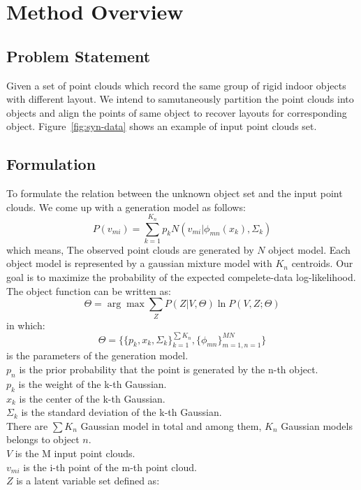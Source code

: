 \section{Method Overview}
\label{sec:method}
\subsection{Problem Statement}
Given a set of point clouds which record the same group of rigid indoor objects with different layout. We intend to samutaneously partition the point clouds into objects and align the points of same object to recover layouts for corresponding object. Figure~\ref{fig:syn-data} shows an example of input point clouds set.
\subsection{Formulation}
To formulate the relation between the unknown object set and the input point clouds. We come up with a generation model as follows:
\begin{equation}
\label{equ:model}
P(v_{mi})=\sum^{K_n}_{k=1}p_kN(v_{mi}|\phi_{mn}(x_k),\Sigma_k)
\end{equation}
which means,
The observed point clouds are generated by $N$ object model. 
Each object model is represented by a gaussian mixture model with $K_n$ centroids.
Our goal is to maximize the probability of the expected compelete-data log-likelihood. 
The object function can be written as:
\begin{equation}
\label{equ:obj0}
\Theta=\arg\max{\sum_ZP(Z|V,\Theta)\ln{P(V,Z;\Theta)}}
\end{equation}
in which:
$$\Theta=\{\{p_k,x_k,\Sigma_k\}_{k=1}^{\sum{K_n}},\{\phi_{mn}\}_{m=1,n=1}^{MN}\}$$
is the parameters of the generation model.\\
$p_n$ is the prior probability that the point is generated by the n-th object.\\
$p_k$ is the weight of the k-th Gaussian.\\
$x_k$ is the center of the k-th Gaussian.\\
$\Sigma_k$ is the standard deviation of the k-th Gaussian.\\
There are $\sum{K_n}$ Gaussian model in total and among them, $K_n$ Gaussian models belongs to object $n$.\\
$V$ is the M input point clouds.\\
$v_{mi}$ is the i-th point of the m-th point cloud.\\
$Z$ is a latent variable set defined as:\\

